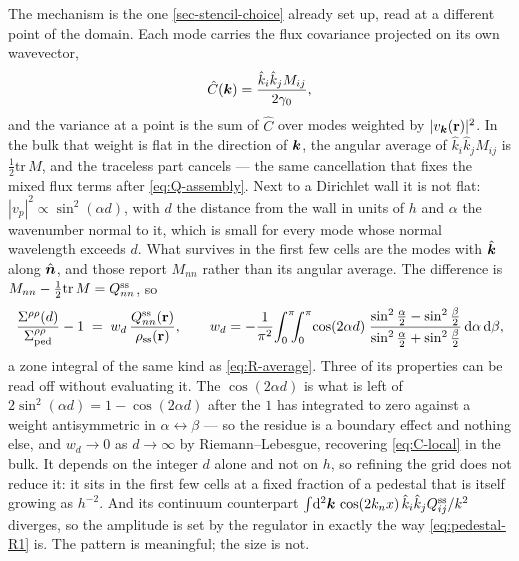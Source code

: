 \documentclass[a5paper]{article}
\begin{document}
The mechanism is the one \cref{sec-stencil-choice} already set up, read at a different point of the domain. Each mode carries the flux covariance projected on its own wavevector,
\begin{equation}
    \label{eq:mode-projection}
    \hat C(\k) = \frac{\hat k_i\hat k_j M_{ij}}{2\gamma_0},
\end{equation}
and the variance at a point is the sum of $\hat C$ over modes weighted by $|v_{\k}(\r)|^2$. In the bulk that weight is flat in the direction of $\k$, the angular average of $\hat k_i\hat k_jM_{ij}$ is $\tfrac12\mathrm{tr}\,M$, and the traceless part cancels --- the same cancellation that fixes the mixed flux terms after \eqref{eq:Q-assembly}. Next to a Dirichlet wall it is not flat: $|v_p|^2\propto\sin^2(\alpha d)$, with $d$ the distance from the wall in units of $h$ and $\alpha$ the wavenumber normal to it, which is small for every mode whose normal wavelength exceeds $d$. What survives in the first few cells are the modes with $\hat\k$ along $\nh$, and those report $M_{nn}$ rather than its angular average. The difference is $M_{nn}-\tfrac12\mathrm{tr}\,M = Q^\ss_{nn}$, so
\begin{equation}
    \label{eq:wall-kernel}
    \frac{\Sigma^{\rho\rho}(d)}{\Sigma^{\rho\rho}_{\rm ped}} - 1
    \;=\; w_d\,\frac{Q^\ss_{nn}(\r)}{\rho_\ss(\r)},
    \qquad
    w_d = -\frac{1}{\pi^2}\!\int_0^\pi\!\!\!\int_0^\pi\!
    \cos(2\alpha d)\;
    \frac{\sin^2\frac\alpha2-\sin^2\frac\beta2}{\sin^2\frac\alpha2+\sin^2\frac\beta2}
    \,\d\alpha\,\d\beta ,
\end{equation}
a zone integral of the same kind as \eqref{eq:R-average}. Three of its properties can be read off without evaluating it. The $\cos(2\alpha d)$ is what is left of $2\sin^2(\alpha d) = 1-\cos(2\alpha d)$ after the $1$ has integrated to zero against a weight antisymmetric in $\alpha\leftrightarrow\beta$ --- so the residue is a boundary effect and nothing else, and $w_d\to0$ as $d\to\infty$ by Riemann--Lebesgue, recovering \eqref{eq:C-local} in the bulk. It depends on the integer $d$ alone and not on $h$, so refining the grid does not reduce it: it sits in the first few cells at a fixed fraction of a pedestal that is itself growing as $h^{-2}$. And its continuum counterpart $\int\!\d^2\k\,\cos(2k_nx)\,\hat k_i\hat k_jQ^\ss_{ij}/k^2$ diverges, so the amplitude is set by the regulator in exactly the way \eqref{eq:pedestal-R1} is. The pattern is meaningful; the size is not.
\end{document}
